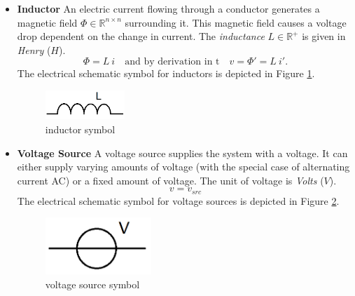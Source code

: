 \begin{itemize}
	\item \textbf{Inductor} \newline
	An electric current flowing through a conductor generates a magnetic field $\Phi \in \mathbb{R}^{n \times n}$ surrounding it. This magnetic field causes a voltage drop dependent on the change in current. The \emph{inductance} $L \in \mathbb{R}^+$ is given in \emph{Henry} ($H$).
	\begin{equation}
		\label{eq:inductor law}
		\Phi = L \ i \quad \text{and by derivation in t} \quad v = \Phi' = L \ i'.
	\end{equation}
	The electrical schematic symbol for inductors is depicted in Figure \ref{fig:inductor symbol}.
	\begin{figure}[H]
		\centering
		\includegraphics[width=3cm]{pictures/inductance.png}
		\caption{inductor symbol}
		\label{fig:inductor symbol}
	\end{figure}

	\item \textbf{Voltage Source} \newline
	A voltage source supplies the system with a voltage. It can either supply varying amounts of voltage (with the special case of alternating current AC) or a fixed amount of voltage. The unit of voltage is \emph{Volts} ($V$).
	\begin{equation}
		\label{eq:voltage source law}
		v = v_{src}
	\end{equation}
	The electrical schematic symbol for voltage sources is depicted in Figure \ref{fig:voltage source symbol}.
	\begin{figure}[H]
		\centering
		\includegraphics[width=4cm]{pictures/voltage_source.png}
		\caption{voltage source symbol}
		\label{fig:voltage source symbol}
	\end{figure}


\end{itemize}
